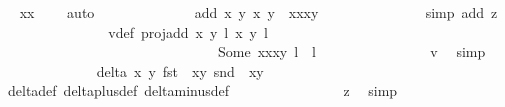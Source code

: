 \begin{isabellebody}
\ \isamarkupfalse%
\ {\isachardoublequoteopen}x{\isacharasterisk}x\ {\isacharequal}\ {}{\isachardoublequoteclose}\ \isamarkupfalse%
\ auto\isanewline
\ \ \ \ \ \ \ \ \ \ \ \ \isamarkupfalse%
\ {\isachardoublequoteopen}add\ {\isacharparenleft}x{\isacharcomma}\ y{\isacharparenright}\ {\isacharparenleft}x{\isacharprime}{\isacharcomma}\ y{\isacharprime}{\isacharparenright}\ {\isacharequal}\ {\isacharparenleft}x{\isacharasterisk}x{\isacharprime}{\isacharcomma}x{\isacharasterisk}y{\isacharprime}{\isacharparenright}{\isachardoublequoteclose}\isanewline
\ \ \ \ \ \ \ \ \ \ \ \ \ \ \isamarkupfalse%
{\isacharparenleft}simp\ add{\isacharcolon}\ z{}{\isacharparenright}\isanewline
\ \ \ \ \ \ \ \ \ \ \ \ \isamarkupfalse%
\ \isamarkupfalse%
\ v{}{\isacharunderscore}def{\isacharcolon}\ {\isachardoublequoteopen}proj{\isacharunderscore}add\ {\isacharparenleft}{\isacharparenleft}x{\isacharcomma}\ y{\isacharparenright}{\isacharcomma}\ l{\isacharparenright}\ {\isacharparenleft}{\isacharparenleft}x{\isacharprime}{\isacharcomma}\ y{\isacharprime}{\isacharparenright}{\isacharcomma}\ l{\isacharprime}{\isacharparenright}\ {\isacharequal}\ \isanewline
\ \ \ \ \ \ \ \ \ \ \ \ \ \ \ \ \ \ \ \ \ \ \ \ \ \ \ \ \ \ \ Some\ {\isacharparenleft}{\isacharparenleft}x{\isacharasterisk}x{\isacharprime}{\isacharcomma}x{\isacharasterisk}y{\isacharprime}{\isacharparenright}{\isacharcomma}\ l\ {\isacharplus}\ l{\isacharprime}{\isacharparenright}{\isachardoublequoteclose}\isanewline
\ \ \ \ \ \ \ \ \ \ \ \ \ \ \isamarkupfalse%
\ v{}\ \isamarkupfalse%
\ simp\isanewline
\ \ \ \ \ \ \ \ \ \ \ \ \isamarkupfalse%
\ {\isachardoublequoteopen}delta\ x\ y\ {\isacharparenleft}fst\ {\isacharparenleft}{\isasymtau}\ {\isacharparenleft}x{\isacharprime}{\isacharcomma}y{\isacharprime}{\isacharparenright}{\isacharparenright}{\isacharparenright}\ {\isacharparenleft}snd\ {\isacharparenleft}{\isasymtau}\ {\isacharparenleft}x{\isacharprime}{\isacharcomma}y{\isacharprime}{\isacharparenright}{\isacharparenright}{\isacharparenright}\ {\isasymnoteq}\ {}{\isachardoublequoteclose}\isanewline
\ \ \ \ \ \ \ \ \ \ \ \ \ \ \isamarkupfalse%
\ delta{\isacharunderscore}def\ delta{\isacharunderscore}plus{\isacharunderscore}def\ delta{\isacharunderscore}minus{\isacharunderscore}def\isanewline
\ \ \ \ \ \ \ \ \ \ \ \ \ \ \isamarkupfalse%
\ z{}\ \isamarkupfalse%
\ simp\isanewline

\end{isabellebody}
